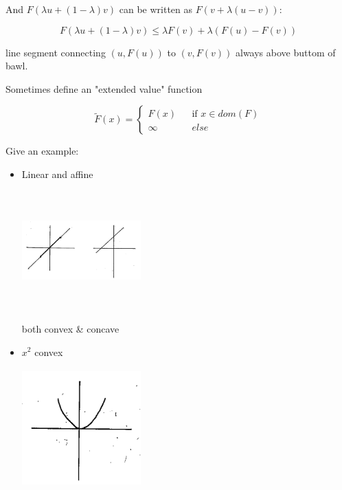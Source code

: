 And $F(\lambda u + (1-\lambda)v)$ can be written as $F(v + \lambda(u-v))$:

\begin{equation*}
F(\lambda u + (1-\lambda)v) \leq \lambda F(v) + \lambda(F(u)-F(v))
\end{equation*}

line segment connecting $(u,F(u))$ to $(v, F(v))$ always above buttom of bawl.


Sometimes define an "extended value" function

$$ \tilde{F}(x)=\left\{
\begin{array}{rcl}
F(x)       &      & \text{if } x\in dom(F)\\
\infty   &      & else
\end{array} \right. 
$$

Give an example:
\begin{itemize}
	\item Linear and affine
	
	\begin{marginfigure}
	\centering
	\includegraphics[width=1.8in,height=1.8in]{figures/ch08/figure1030_7.png}
	\end{marginfigure}
	
	both convex \& concave
	
	\item $x^2$ convex
	
	\begin{marginfigure}
	\centering
	\includegraphics[width=1.8in,height=1.8in]{figures/ch08/figure1030_8.png}
	\end{marginfigure}
	

\end{itemize}
